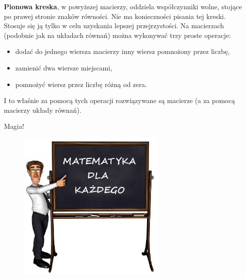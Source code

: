 \documentclass[12pt, a4paper]{article}
\begin{document}
\newline\textbf{Pionowa kreska}, w powyższej macierzy, oddziela współczynniki wolne, stojące po prawej stronie znaków równości. Nie ma konieczności pisania tej kreski. Stosuje się ją tylko w celu uzyskania lepszej przejrzystości.
\newpage Na macierzach (podobnie jak na układach równań) można wykonywać trzy proste operacje:
\begin{itemize}
\item dodać do jednego wiersza macierzy inny wiersz pomnożony przez liczbę,
\item zamienić dwa wiersze miejscami,
\item pomnożyć wiersz przez liczbę różną od zera.
\end{itemize}
I to właśnie za pomocą tych operacji rozwiązywane są macierze (a za pomocą macierzy układy równań).\cite{matemaks} 
\newline\begin{center}\Huge Magia!\end{center}
\begin{figure}[hp]
	\centering
		\includegraphics[width=0.65\textwidth]{matematyk.jpg}
	\label{fig:matematyk}
\end{figure}

\normalsize
\newpage
\end{document}
